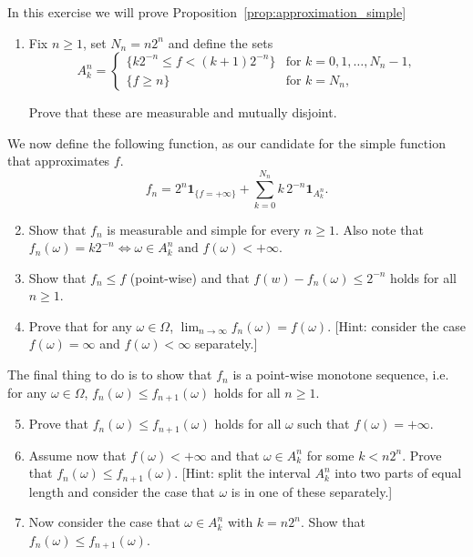 \begin{problem}\label{prb:approximation_simple}
In this exercise we will prove Proposition~\ref{prop:approximation_simple}

\begin{enumerate}[label=(\alph*)]
\item Fix $n \ge 1$, set $N_n = n 2^n$ and define the sets
\[
	A_k^n = \begin{cases}
		\{ k 2^{-n} \le f < (k+1) 2^{-n}\} &\text{for } k = 0,1, \dots, N_n - 1,\\
		\{ f \ge n\} &\text{for } k = N_n,
	\end{cases}
\]

Prove that these are measurable and mutually disjoint.
\end{enumerate}

We now define the following function, as our candidate for the simple function that approximates $f$.
\[
	f_n = 2^n\mathbf{1}_{\{f=+\infty\}} + \sum_{k=0}^{N_n} k \, 2^{-n} \mathbf{1}_{A_k^n}.
\]

\begin{enumerate}[label=(\alph*)]
\setcounter{enumi}{1}
\item Show that $f_n$ is measurable and simple for every $n \ge 1$. Also note that $f_n(\omega) = k 2^{-n} \iff \omega \in A_k^n \text{ and } f(\omega) < +\infty$.
\item Show that $f_n \le f$ (point-wise) and that $f(w) - f_n(\omega) \le 2^{-n}$ holds for all $n \ge 1$.
\item Prove that for any $\omega \in \Omega$, $\lim_{n \to \infty} f_n(\omega) = f(\omega)$. [Hint: consider the case $f(\omega) = \infty$ and $f(\omega) < \infty$ separately.]
\end{enumerate}

The final thing to do is to show that $f_n$ is a point-wise monotone sequence, i.e. for any $\omega \in \Omega$, $f_n(\omega) \le f_{n+1}(\omega)$ holds for all $n \ge 1$.

\begin{enumerate}[label=(\alph*)]
\setcounter{enumi}{4}
\item Prove that $f_n(\omega) \le f_{n+1}(\omega)$ holds for all $\omega$ such that $f(\omega) = +\infty$.
\item Assume now that $f(\omega) < +\infty$ and that $\omega \in A_k^n$ for some $k < n 2^n$. Prove that $f_n(\omega) \le f_{n+1}(\omega)$. [Hint: split the interval $A_k^n$ into two parts of equal length and consider the case that $\omega$ is in one of these separately.]
\item Now consider the case that $\omega \in A_k^n$ with $k = n 2^n$. Show that $f_n(\omega) \le f_{n+1}(\omega)$.
\end{enumerate}


\end{problem}
